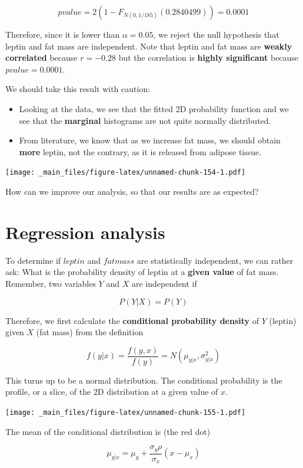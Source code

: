 \documentclass[
]{book}
\begin{document}
\[pvalue=2(1- F_{N(0,1/185)}(0.2840499))=0.0001\]

Therefore, since it is lower than \(\alpha=0.05\), we reject the null hypothesis that leptin and fat mass are independent. Note that leptin and fat mass are \textbf{weakly correlated} because \(r=-0.28\) but the correlation is \textbf{highly significant} because \(pvalue=0.0001\).

We should take this result with caution:

\begin{itemize}
\item
  Looking at the data, we see that the fitted 2D probability function and we see that the \textbf{marginal} histograms are not quite normally distributed.
\item
  From literature, we know that as we increase fat mass, we should obtain \textbf{more} leptin, not the contrary, as it is released from adipose tissue.
\end{itemize}

\texttt{[image: \_main\_files/figure-latex/unnamed-chunk-154-1.pdf]}

How can we improve our analysis, so that our results are as expected?

\hypertarget{regression-analysis}{%
\section{Regression analysis}\label{regression-analysis}}

To determine if \(leptin\) and \(fatmass\) are statistically independent, we can rather ask: What is the probability density of leptin at a \textbf{given value} of fat mass. Remember, two variables \(Y\) and \(X\) are independent if

\[P(Y|X)=P(Y)\]

Therefore, we first calculate the \textbf{conditional probability density} of \(Y\) (leptin) given \(X\) (fat mass) from the definition

\[f(y|x)=\frac{f(y,x)}{f(y)}
=N(\mu_{y|x}, \sigma^2_{y|x})\]

This turns up to be a normal distribution. The conditional probability is the profile, or a slice, of the 2D distribution at a given value of \(x\).

\texttt{[image: \_main\_files/figure-latex/unnamed-chunk-155-1.pdf]}

The mean of the conditional distribution is (the red dot)

\[\mu_{y|x}=\mu_y+\frac{\sigma_y\rho}{\sigma_x}(x-\mu_x)\]
\end{document}
